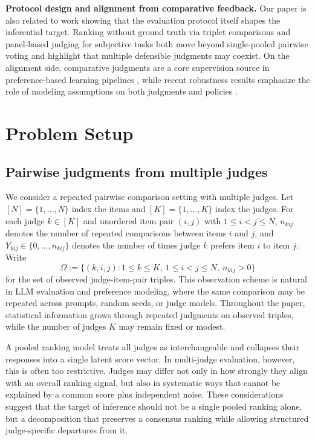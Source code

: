 \documentclass{article}
\begin{document}
\begin{bibunit}[unsrtnat]
\noindent\textbf{Protocol design and alignment from comparative feedback.}
Our paper is also related to work showing that the evaluation protocol itself shapes the inferential target. Ranking without ground truth via triplet comparisons \citep{dhurandhar2024ranking} and panel-based judging for subjective tasks \citep{zhao2025lmc} both move beyond single-pooled pairwise voting and highlight that multiple defensible judgments may coexist. On the alignment side, comparative judgments are a core supervision source in preference-based learning pipelines \citep{christiano2017preferences,ouyang2022instructgpt,rafailov2023dpo}, while recent robustness results emphasize the role of modeling assumptions on both judgments and policies \citep{xu2025drpo}. 



\section{Problem Setup}
\subsection{Pairwise judgments from multiple judges}

We consider a repeated pairwise comparison setting with multiple judges. 
Let $[N]=\{1,\ldots,N\}$ index the items and $[K]=\{1,\ldots,K\}$ index the judges. 
For each judge $k\in[K]$ and unordered item pair $(i,j)$ with $1\le i<j\le N$, $n_{kij}$ denotes the number of repeated comparisons between items $i$ and $j$, and $Y_{kij}\in\{0,\ldots,n_{kij}\}$ denotes the number of times judge $k$ prefers item $i$ to item $j$. 
Write
\[
\Omega := \{(k,i,j): 1\le k\le K,\ 1\le i<j\le N,\ n_{kij}>0\}
\]
for the set of observed judge-item-pair triples. This observation scheme is natural in LLM evaluation and preference modeling, where the same comparison may be repeated across prompts, random seeds, or judge models. Throughout the paper, statistical information grows through repeated judgments on observed triples, while the number of judges $K$ may remain fixed or modest.

A pooled ranking model treats all judges as interchangeable and collapses their responses into a single latent score vector. In multi-judge evaluation, however, this is often too restrictive. Judges may differ not only in how strongly they align with an overall ranking signal, but also in systematic ways that cannot be explained by a common score plus independent noise. These considerations suggest that the target of inference should not be a single pooled ranking alone, but a decomposition that preserves a consensus ranking while allowing structured judge-specific departures from it.



\end{bibunit}
\end{document}
